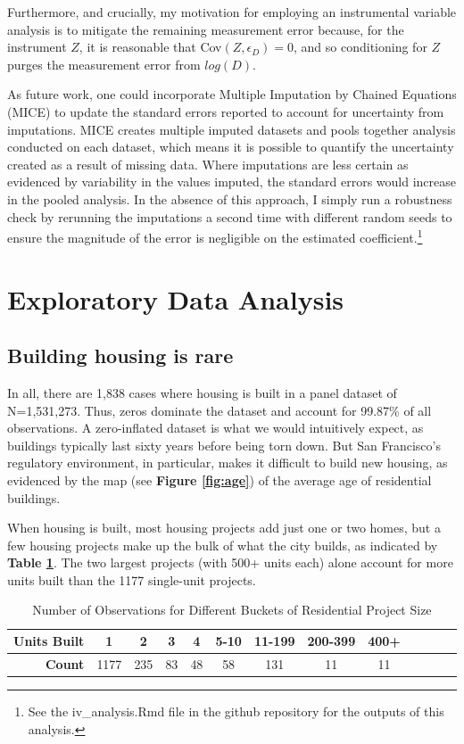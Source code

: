 \documentclass[a4paper,12pt]{article}
\begin{document}
Furthermore, and crucially, my motivation for employing an instrumental variable analysis is to mitigate the remaining measurement error because, for the instrument $Z$, it is reasonable that Cov$(Z, \epsilon_{D}) = 0$, and so conditioning for $Z$ purges the measurement error from $log(D)$.

As future work, one could incorporate Multiple Imputation by Chained Equations (MICE) to update the standard errors reported to account for uncertainty from imputations. MICE creates multiple imputed datasets and pools together analysis conducted on each dataset, which means it is possible to quantify the uncertainty created as a result of missing data. Where imputations are less certain as evidenced by variability in the values imputed, the standard errors would increase in the pooled analysis.\cite{azur2011multiple} In the absence of this approach, I simply run a robustness check by rerunning the imputations a second time with different random seeds to ensure the magnitude of the error is negligible on the estimated coefficient.\footnote{See the iv\_analysis.Rmd file in the github repository for the outputs of this analysis.}

\section{Exploratory Data Analysis}

\subsection{Building housing is rare}

In all, there are 1,838 cases where housing is built in a panel dataset of N=1,531,273. Thus, zeros dominate the dataset and account for 99.87\% of all observations. A zero-inflated dataset is what we would intuitively expect, as buildings typically last sixty years before being torn down. But San Francisco's regulatory environment, in particular, makes it difficult to build new housing, as evidenced by the map (see \textbf{Figure \ref{fig:age}}) of the average age of residential buildings.

When housing is built, most housing projects add just one or two homes, but a few housing projects make up the bulk of what the city builds, as indicated by \textbf{Table \ref{tab:NetUnitsCompleted}}. The two largest projects (with 500+ units each) alone account for more units built than the 1177 single-unit projects.


\begin{table}[hbt]
\centering
\caption{Number of Observations for Different Buckets of Residential Project Size}
\setlength{\tabcolsep}{10pt} 
\begin{tabular}{r|cccccccccccc}

\hline
\textbf{Units Built} & 1 & 2 & 3 & 4 & 5-10 & 11-199 & 200-399 & 400+ \\
\hline
\textbf{Count} & 1177 & 235 & 83 & 48 & 58 & 131 & 11 & 11 \\
\hline
\end{tabular}
\label{tab:NetUnitsCompleted}
\end{table}
\end{document}

